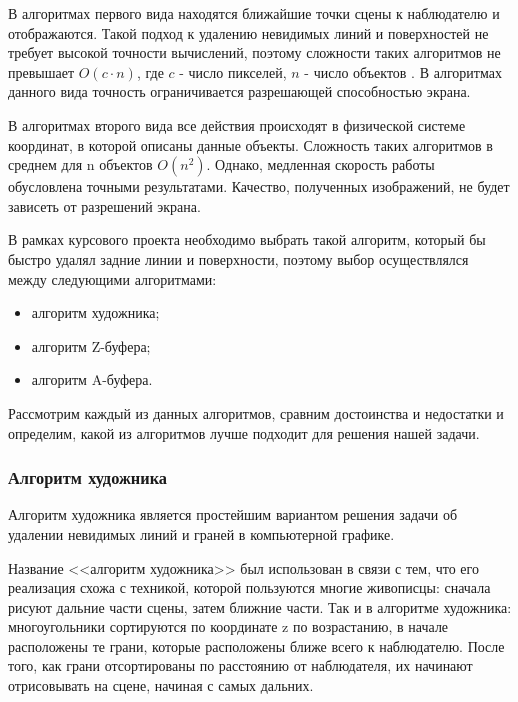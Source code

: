 \vspace{0.3cm}В алгоритмах первого вида находятся ближайшие точки сцены к наблюдателю и отображаются. Такой подход к удалению невидимых линий и поверхностей не требует высокой точности вычислений, поэтому сложности таких алгоритмов не превышает $O(c \cdot n)$, где $c$ - число пикселей, $n$ - число объектов \cite{machinegraph}. В алгоритмах данного вида точность ограничивается разрешающей способностью экрана.

\vspace{0.3cm}В алгоритмах второго вида все действия происходят в физической системе координат, в которой описаны данные объекты. Сложность таких алгоритмов в среднем для n объектов $O(n^2)$\cite{machinegraph}. Однако, медленная скорость работы обусловлена точными результатами. Качество, полученных изображений, не будет зависеть от разрешений экрана.

\vspace{0.3cm}В рамках курсового проекта необходимо выбрать такой алгоритм, который бы быстро удалял задние линии и поверхности, поэтому выбор осуществлялся между следующими алгоритмами:
\begin{itemize}
	\item алгоритм художника;
	\item алгоритм Z-буфера;
	\item алгоритм A-буфера.
\end{itemize}
\vspace{0.3cm}Рассмотрим каждый из данных алгоритмов, сравним достоинства и недостатки и определим, какой из алгоритмов лучше подходит для решения нашей задачи.

\subsubsection{Алгоритм художника}
\hspace{0.6cm}Алгоритм художника является простейшим вариантом решения задачи об удалении невидимых линий и граней в компьютерной графике.

\vspace{0.3cm}Название <<алгоритм художника>> был использован в связи с тем, что его реализация схожа с техникой, которой пользуются многие живописцы: сначала рисуют дальние части сцены, затем ближние части. Так и в алгоритме художника: многоугольники сортируются по координате z по возрастанию, в начале расположены те грани, которые расположены ближе всего к наблюдателю. После того, как грани отсортированы по расстоянию от наблюдателя, их начинают отрисовывать на сцене, начиная с самых дальних.

